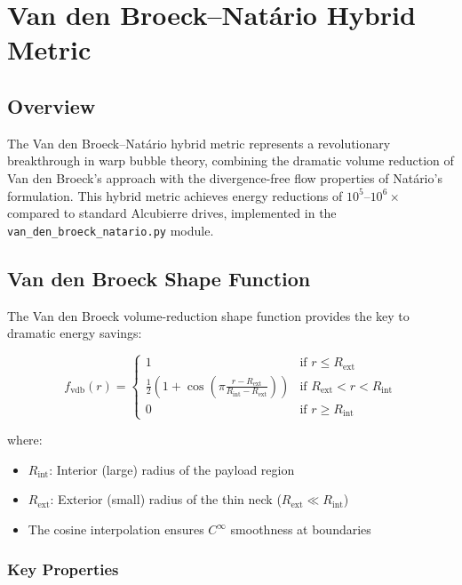 \section{Van den Broeck–Natário Hybrid Metric}

\subsection{Overview}

The Van den Broeck–Natário hybrid metric represents a revolutionary breakthrough in warp bubble theory, combining the dramatic volume reduction of Van den Broeck's approach with the divergence-free flow properties of Natário's formulation. This hybrid metric achieves energy reductions of $10^5$--$10^6\times$ compared to standard Alcubierre drives, implemented in the \texttt{van\_den\_broeck\_natario.py} module.

\subsection{Van den Broeck Shape Function}

The Van den Broeck volume-reduction shape function provides the key to dramatic energy savings:

\begin{equation}
f_{\text{vdb}}(r) = \begin{cases}
1 & \text{if } r \leq R_{\text{ext}} \\
\frac{1}{2}\left(1 + \cos\left(\pi \frac{r - R_{\text{ext}}}{R_{\text{int}} - R_{\text{ext}}}\right)\right) & \text{if } R_{\text{ext}} < r < R_{\text{int}} \\
0 & \text{if } r \geq R_{\text{int}}
\end{cases}
\end{equation}

where:
\begin{itemize}
\item $R_{\text{int}}$: Interior (large) radius of the payload region
\item $R_{\text{ext}}$: Exterior (small) radius of the thin neck ($R_{\text{ext}} \ll R_{\text{int}}$)
\item The cosine interpolation ensures $C^{\infty}$ smoothness at boundaries
\end{itemize}

\subsubsection{Key Properties}

